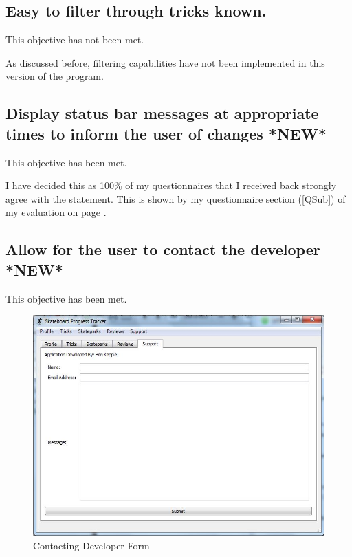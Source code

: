\subsection{ Easy to filter through tricks known.}

This objective has not been met. 

As discussed before, filtering capabilities have not been implemented in this version of the program.



\subsection {Display status bar messages at appropriate times to inform the user of changes *NEW*} %

This objective has been met.

I have decided this as 100\% of my questionnaires that I received back strongly agree with the statement. This is shown by my questionnaire section (\ref{QSub}) of my evaluation on page \pageref{QSub}.



\subsection {Allow for the user to contact the developer *NEW*}

This objective has been met.


\begin{figure}[H]
    \includegraphics[width=\textwidth]{./Evaluation/images/Contactsupport.jpg}
    \caption{Contacting Developer Form} \label{fig:ContactSupportEVD}
\end{figure}


